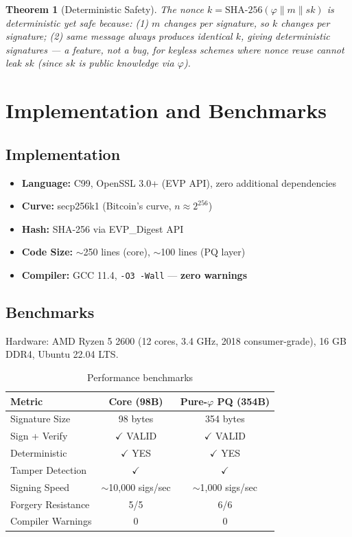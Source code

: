\documentclass{article}
\newtheorem{theorem}{Theorem}[section]
\begin{document}
\begin{theorem}[Deterministic Safety]
The nonce $k = \text{SHA-256}(\varphi \parallel m \parallel sk)$ is deterministic yet safe because: (1) $m$ changes per signature, so $k$ changes per signature; (2) same message always produces identical $k$, giving deterministic signatures — a feature, not a bug, for keyless schemes where nonce reuse cannot leak $sk$ (since $sk$ is public knowledge via $\varphi$).
\end{theorem}

\section{Implementation and Benchmarks}

\subsection{Implementation}

\begin{itemize}
    \item \textbf{Language:} C99, OpenSSL 3.0+ (EVP API), zero additional dependencies
    \item \textbf{Curve:} secp256k1 (Bitcoin's curve, $n \approx 2^{256}$)
    \item \textbf{Hash:} SHA-256 via EVP\_Digest API
    \item \textbf{Code Size:} $\sim$250 lines (core), $\sim$100 lines (PQ layer)
    \item \textbf{Compiler:} GCC 11.4, \texttt{-O3 -Wall} — \textbf{zero warnings}
\end{itemize}

\subsection{Benchmarks}

Hardware: AMD Ryzen 5 2600 (12 cores, 3.4 GHz, 2018 consumer-grade), 16 GB DDR4, Ubuntu 22.04 LTS.

\begin{table}[H]
\centering
\begin{tabular}{|l|c|c|}
\hline
\textbf{Metric} & \textbf{Core (98B)} & \textbf{Pure-$\varphi$ PQ (354B)} \\
\hline
Signature Size & 98 bytes & 354 bytes \\
Sign + Verify & $\checkmark$ VALID & $\checkmark$ VALID \\
Deterministic & $\checkmark$ YES & $\checkmark$ YES \\
Tamper Detection & $\checkmark$ & $\checkmark$ \\
Signing Speed & $\sim$10,000 sigs/sec & $\sim$1,000 sigs/sec \\
Forgery Resistance & 5/5 & 6/6 \\
Compiler Warnings & 0 & 0 \\
\hline
\end{tabular}
\caption{Performance benchmarks}
\end{table}
\end{document}
